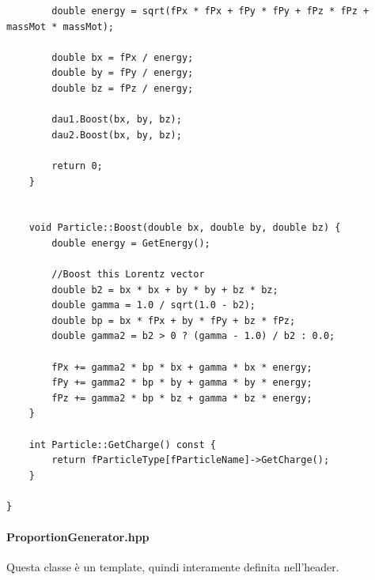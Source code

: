 \documentclass[12pt, a4paper]{article}
\begin{document}
\begin{verbatim}
        double energy = sqrt(fPx * fPx + fPy * fPy + fPz * fPz + massMot * massMot);

        double bx = fPx / energy;
        double by = fPy / energy;
        double bz = fPz / energy;

        dau1.Boost(bx, by, bz);
        dau2.Boost(bx, by, bz);

        return 0;
    }


    void Particle::Boost(double bx, double by, double bz) {
        double energy = GetEnergy();

        //Boost this Lorentz vector
        double b2 = bx * bx + by * by + bz * bz;
        double gamma = 1.0 / sqrt(1.0 - b2);
        double bp = bx * fPx + by * fPy + bz * fPz;
        double gamma2 = b2 > 0 ? (gamma - 1.0) / b2 : 0.0;

        fPx += gamma2 * bp * bx + gamma * bx * energy;
        fPy += gamma2 * bp * by + gamma * by * energy;
        fPz += gamma2 * bp * bz + gamma * bz * energy;
    }

    int Particle::GetCharge() const {
        return fParticleType[fParticleName]->GetCharge();
    }

}
\end{verbatim}


\paragraph{ProportionGenerator.hpp}
Questa classe è un template, quindi interamente definita nell'header.
\end{document}
